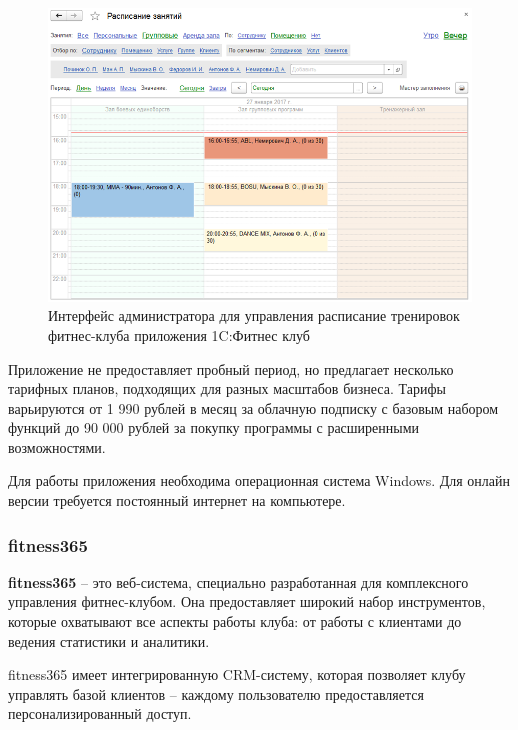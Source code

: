 \begin{figure}[ht!]
	\begin{center}
		\includegraphics[scale=0.46]{./img/1c-2.png}
	\end{center}
	\caption{Интерфейс администратора для управления расписание тренировок фитнес-клуба приложения 1C:Фитнес клуб}
	\label{fig:1c-2}
\end{figure}

Приложение не предоставляет пробный период, но предлагает несколько тарифных планов, подходящих для разных масштабов бизнеса. Тарифы варьируются от 1 990 рублей в месяц за облачную подписку с базовым набором функций до 90 000 рублей за покупку программы с расширенными возможностями.

Для работы приложения необходима операционная система Windows. Для онлайн версии требуется постоянный интернет на компьютере.

\subsubsection*{fitness365}

\textbf{fitness365} -- это веб-система, специально разработанная для комплексного управления фитнес-клубом. Она предоставляет широкий набор инструментов, которые охватывают все аспекты работы клуба: от работы с клиентами до ведения статистики и аналитики.

fitness365 имеет интегрированную CRM-систему, которая позволяет клубу управлять базой клиентов -- каждому пользователю предоставляется персонализированный доступ.

